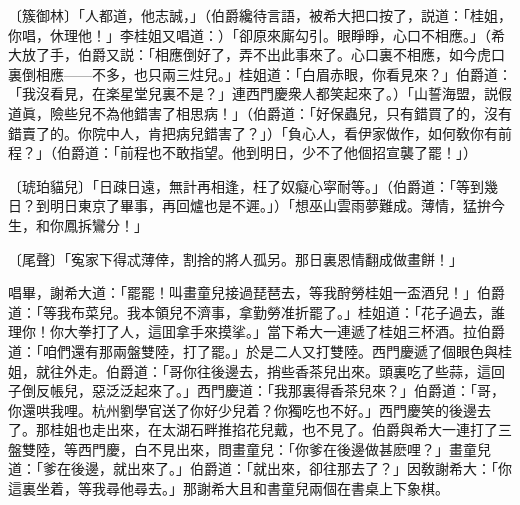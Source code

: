 \begin{myquote}
{\markfont〔簇御林〕}「人都道，他志誠，」{\markfont\small\color{mydarkgray}（伯爵纔待言語，被希大把口按了，説道：「桂姐，你唱，休理他！」李桂姐又唱道：）}「卻原來廝勾引。眼睜睜，心口不相應。」{\markfont\small\color{mydarkgray}（希大放了手，伯爵又説：「相應倒好了，弄不出此事來了。心口裏不相應，如今虎口裏倒相應——不多，也只兩三炷兒。」桂姐道：「白眉赤眼，你看見來？」伯爵道：「我沒看見，在楽星堂兒裏不是？」連西門慶衆人都笑起來了。）}「山誓海盟，説假道眞，險些兒不為他錯害了相思病！」{\markfont\small\color{mydarkgray}（伯爵道：「好保蟲兒，只有錯買了的，沒有錯賣了的。你院中人，肯把病兒錯害了？」）}「負心人，看伊家做作，如何敎你有前程？」{\markfont\small\color{mydarkgray}（伯爵道：「前程也不敢指望。他到明日，少不了他個招宣襲了罷！」）}

{\markfont〔琥珀貓兒〕}「日疎日遠，無計再相逢，枉了奴癡心寜耐等。」{\markfont\small\color{mydarkgray}（伯爵道：「等到幾日？到明日東京了畢事，再回爐也是不遲。」）}「想巫山雲雨夢難成。薄情，猛拚今生，和你鳳拆鸞分！」

{\markfont〔尾聲〕}「寃家下得忒薄倖，割捨的將人孤另。那日裏恩情翻成做畫餅！」
\end{myquote}

唱畢，謝希大道：「罷罷！叫畫童兒接過琵琶去，等我酧勞桂姐一盃酒兒！」伯爵道：「等我布菜兒。我本領兒不濟事，拿勤勞准折罷了。」桂姐道：「花子過去，誰理你！你大拳打了人，這囬拿手來摸挲。」當下希大一連遞了桂姐三杯酒。拉伯爵道：「咱們還有那兩盤雙陸，打了罷。」於是二人又打雙陸。西門慶遞了個眼色與桂姐，就往外走。伯爵道：「哥你往後邊去，捎些香茶兒出來。頭裏吃了些蒜，這回子倒反帳兒，惡泛泛起來了。」西門慶道：「我那裏得香茶兒來？」伯爵道：「哥，你還哄我哩。杭州劉學官送了你好少兒着？你獨吃也不好。」西門慶笑的後邊去了。那桂姐也走出來，在太湖石畔推掐花兒戴，也不見了。伯爵與希大一連打了三盤雙陸，等西門慶，白不見出來，問畫童兒：「你爹在後邊做甚麽哩？」畫童兒道：「爹在後邊，就出來了。」伯爵道：「就出來，卻往那去了？」因敎謝希大：「你這裏坐着，等我尋他尋去。」那謝希大且和書童兒兩個在書桌上下象棋。

